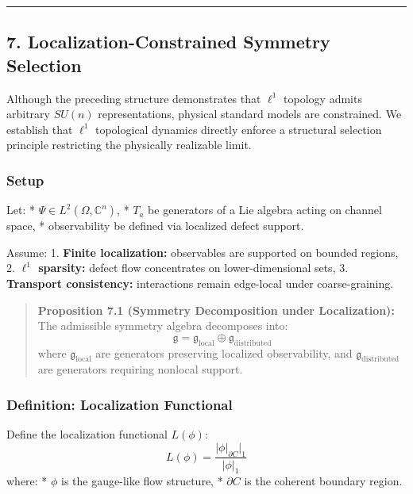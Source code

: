 \documentclass[
]{article}
\begin{document}
\begin{center}\rule{0.5\linewidth}{0.5pt}\end{center}

\subsection{7. Localization-Constrained Symmetry
Selection}\label{localization-constrained-symmetry-selection}

Although the preceding structure demonstrates that \(\ell^1\) topology
admits arbitrary \(SU(n)\) representations, physical standard models are
constrained. We establish that \(\ell^1\) topological dynamics directly
enforce a structural selection principle restricting the physically
realizable limit.

\subsubsection{Setup}\label{setup-2}

Let: * \(\Psi \in L^2(\Omega, \mathbb{C}^n)\), * \(T_a\) be generators
of a Lie algebra acting on channel space, * observability be defined via
localized defect support.

Assume: 1. \textbf{Finite localization:} observables are supported on
bounded regions, 2. \textbf{\(\ell^1\) sparsity:} defect flow
concentrates on lower-dimensional sets, 3. \textbf{Transport
consistency:} interactions remain edge-local under coarse-graining.

\begin{quote}
\textbf{Proposition 7.1 (Symmetry Decomposition under Localization):}
The admissible symmetry algebra decomposes into:
\[ \mathfrak{g} = \mathfrak{g}_{\text{local}} \oplus \mathfrak{g}_{\text{distributed}} \]
where \(\mathfrak{g}_{\text{local}}\) are generators preserving
localized observability, and \(\mathfrak{g}_{\text{distributed}}\) are
generators requiring nonlocal support.
\end{quote}

\subsubsection{Definition: Localization
Functional}\label{definition-localization-functional}

Define the localization functional \(L(\phi)\):
\[ L(\phi) = \frac{|\phi|_{\partial C}|_1}{|\phi|_1} \] where: *
\(\phi\) is the gauge-like flow structure, * \(\partial C\) is the
coherent boundary region.
\end{document}
